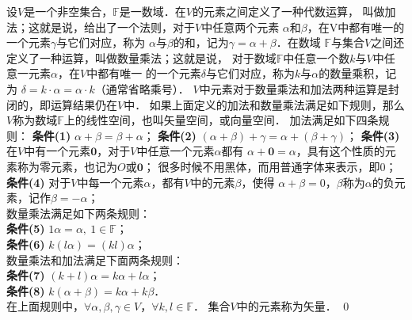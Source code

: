 \begin{definition} \label{chmla:def_linear-space}
    设$V$是一个非空集合，$\mathbb{F}$是一数域．在$V$的元素之间定义了一种代数运算，
    叫做{\heiti 加法}；这就是说，给出了一个法则，对于$V$中任意两个元素
    $\alpha$和$\beta$，在V中都有唯一的一个元素$\gamma$与它们对应，称为
    $\alpha$与$\beta$的{\heiti 和}，记为$\gamma=\alpha+\beta$．在数域
    $\mathbb{F}$与集合$V$之间还定义了一种运算，叫做{\heiti 数量乘法}；这就是说，
    对于数域$\mathbb{F}$中任意一个数$k$与$V$中任意一元素$\alpha$，在$V$中都有唯一
    的一个元素$\delta$与它们对应，称为$k$与$\alpha$的{\heiti 数量乘积}，记为
    $\delta=k\cdot \alpha=\alpha\cdot k$（通常省略乘号）．
    $V$中元素对于数量乘法和加法两种运算是{\heiti 封闭的}，即运算结果仍在$V$中．
    如果上面定义的加法和数量乘法满足如下规则，那么
    $V$称为数域$\mathbb{F}$上的{\heiti 线性空间}，也叫{\heiti 矢量空间}，或向量空间．  \newline  
    加法满足如下四条规则：\newline
    {\heiti\bfseries 条件(1)} \quad $\alpha + \beta = \beta +\alpha$；\newline
    {\heiti\bfseries 条件(2)} \quad $(\alpha + \beta) + \gamma = \alpha+ (\beta + \gamma)$；    \newline
    {\heiti\bfseries 条件(3)} \quad 在$V$中有一个元素$\boldsymbol{0}$，对于$V$中任意一个元素$\alpha$都有
    $\alpha + \boldsymbol{0} = \alpha$，具有这个性质的元素称为{\heiti 零元素}，也记为$O$或$\boldsymbol{0}$；
    很多时候不用黑体，而用普通字体来表示，即$0$； \\
    {\heiti\bfseries 条件(4)} \quad 对于$V$中每一个元素$\alpha$，都有$V$中的元素$\beta$，使得
    $\alpha + \beta = 0$，$\beta$称为$\alpha$的{\heiti 负元素}，记作$\beta = -\alpha$；  \\
    数量乘法满足如下两条规则：\\
    {\heiti\bfseries 条件(5)} \quad $1 \alpha =\alpha, \ 1\in \mathbb{F}$； \\
    {\heiti\bfseries 条件(6)} \quad $k(l\alpha) = (kl) \alpha$；\\
    数量乘法和加法满足下面两条规则：\\
    {\heiti\bfseries 条件(7)} \quad $(k+l)\alpha = k\alpha +l\alpha$； \\
    {\heiti\bfseries 条件(8)} \quad $k(\alpha+\beta) = k\alpha +k\beta$．  \\
    在上面规则中，$\forall \alpha,\beta,\gamma \in V$，$\forall k,l\in \mathbb{F}$．
    集合$V$中的元素称为{\heiti 矢量}．  \qed
\end{definition}

